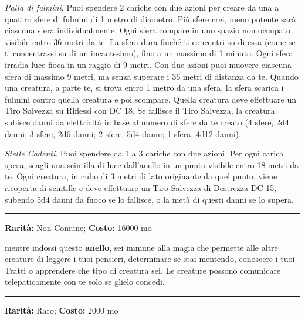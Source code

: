 \begin{multicols}{2}
\emph{Palla di fulmini}. Puoi spendere 2 cariche con due azioni per creare da una a quattro sfere di fulmini di 1 metro di diametro. Più sfere crei, meno potente sarà ciascuna sfera individualmente.
Ogni sfera compare in uno spazio non occupato visibile entro 36 metri da te. La sfera dura finché ti concentri su di essa (come se ti concentrassi su di un incantesimo), fino a un massimo di 1 minuto. Ogni sfera irradia luce fioca in un raggio di 9 metri. Con due azioni puoi muovere ciascuna sfera di massimo 9 metri, ma senza superare i 36 metri di distanza da te. Quando una creatura, a parte te, si trova entro 1 metro da una sfera, la sfera scarica i fulmini contro quella creatura e poi scompare. Quella creatura deve effettuare un Tiro Salvezza su Riflessi con DC 18. Se fallisce il Tiro Salvezza, la creatura subisce danni da elettricità in base al numero di sfere da te creato (4 sfere, 2d4 danni; 3 sfere, 2d6 danni; 2 sfere, 5d4 danni; 1 sfera, 4d12 danni).

\emph{Stelle Cadenti}. Puoi spendere da 1 a 3 cariche con due azioni. Per ogni carica spesa, scagli una scintilla di luce dall'anello in un punto visibile entro 18 metri da te. Ogni creatura, in cubo di 3 metri di lato originante da quel punto, viene ricoperta di scintille e deve effettuare un Tiro Salvezza di Destrezza DC 15, subendo 5d4 danni da fuoco se lo fallisce, o la metà di questi danni se lo supera.

\smallskip\noindent\rule{\linewidth}{2pt}  \hypertarget{AnellodelloScudoMentale}{}\medskip{}\noindent\label{AnellodelloScudoMentale}

\textbf{Rarità:} Non Comune; \textbf{Costo:} 16000 mo

mentre indossi questo \textbf{anello}, sei immune alla magia che permette alle altre creature di leggere i tuoi pensieri, determinare se stai mentendo, conoscere i tuoi Tratti o apprendere che tipo di creatura sei. Le creature possono comunicare telepaticamente con te solo se glielo concedi.

\smallskip\noindent\rule{\linewidth}{2pt}  \hypertarget{AnellodiCadutaPiuma}{}\medskip{}\noindent\label{AnellodiCadutaPiuma}

\textbf{Rarità:} Raro; \textbf{Costo:} 2000 mo


\end{multicols}
